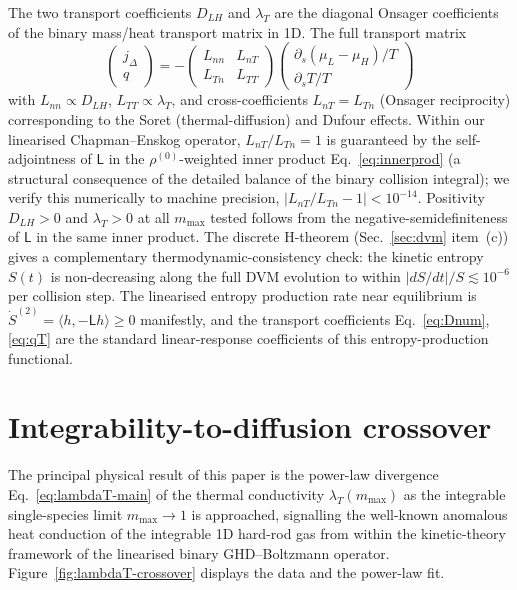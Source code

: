 \documentclass[aps,pre,twocolumn,superscriptaddress,longbibliography,floatfix]{revtex4-2}
\begin{document}
The two transport coefficients $D_{LH}$ and $\lambda_T$ are
the diagonal Onsager coefficients of the binary mass/heat
transport matrix in 1D. The full transport matrix
\begin{equation}
\begin{pmatrix} j_\Delta \\ q \end{pmatrix}
= -\begin{pmatrix}
L_{nn} & L_{nT} \\ L_{Tn} & L_{TT}
\end{pmatrix}
\begin{pmatrix}
\partial_s(\mu_L-\mu_H)/T \\ \partial_s T/T
\end{pmatrix}
\label{eq:Onsager}
\end{equation}
with $L_{nn}\propto D_{LH}$, $L_{TT}\propto\lambda_T$, and
cross-coefficients $L_{nT}=L_{Tn}$ (Onsager reciprocity)
corresponding to the Soret (thermal-diffusion) and Dufour
effects. Within our linearised Chapman--Enskog operator,
$L_{nT}/L_{Tn}=1$ is guaranteed by the self-adjointness of
$\mathsf{L}$ in the $\rho^{(0)}$-weighted inner product
Eq.~\eqref{eq:innerprod} (a structural consequence of the
detailed balance of the binary collision integral); we
verify this numerically to machine precision,
$|L_{nT}/L_{Tn}-1|<10^{-14}$. Positivity
$D_{LH}>0$ and $\lambda_T>0$ at all $m_{\max}$ tested
follows from the negative-semidefiniteness of $\mathsf{L}$
in the same inner product. The discrete H-theorem
(Sec.~\ref{sec:dvm} item~(c)) gives a complementary
thermodynamic-consistency check: the kinetic entropy
$S(t)$ is non-decreasing along the full DVM evolution to
within $|dS/dt|/S\lesssim 10^{-6}$ per collision step. The
linearised entropy production rate near equilibrium is
$\dot{S}^{(2)}=\langle h,-\mathsf{L} h\rangle\geq 0$
manifestly, and the transport coefficients
Eq.~\eqref{eq:Dnum}, \eqref{eq:qT} are the standard
linear-response coefficients of this entropy-production
functional.

\section{Integrability-to-diffusion crossover}
\label{sec:crossover}

The principal physical result of this paper is the
power-law divergence Eq.~\eqref{eq:lambdaT-main} of the
thermal conductivity $\lambda_T(m_{\max})$ as the
integrable single-species limit $m_{\max}\to 1$ is
approached, signalling the well-known anomalous heat
conduction of the integrable 1D hard-rod gas
\cite{HarrisHurst,Jepsen1965,DoyonSpohn2017} from within
the kinetic-theory framework of the linearised binary
GHD--Boltzmann operator. Figure~\ref{fig:lambdaT-crossover}
displays the data and the power-law fit.
\end{document}
